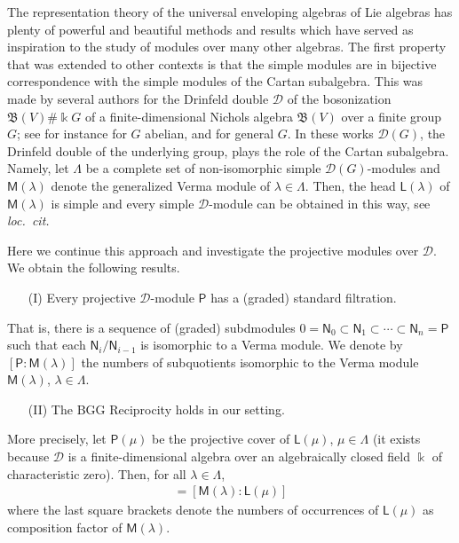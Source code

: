 \documentclass[reqno]{amsart}
\renewcommand{\_}[1]{_{\left( #1 \right)}}
\renewcommand{\^}[1]{^{\left( #1 \right)}}
\newcommand{\ku}{\Bbbk}
\newcommand\fL{\mathsf{L}}
\newcommand\fM{\mathsf{M}}
\newcommand\fN{\mathsf{N}}
\newcommand\fP{\mathsf{P}}
\newcommand{\D}{\mathcal{D}}
\newcommand{\BV}{{\mathfrak B}}
\theoremstyle{plain}
\theoremstyle{definition}
\theoremstyle{remark}
\begin{document}
The representation theory of the universal enveloping algebras of Lie algebras has plenty of powerful and beautiful methods and results which have served as inspiration to the study of modules over many other algebras. The first property that was extended to other contexts is that the simple modules are in bijective correspondence with the simple modules of the Cartan subalgebra. This was made by several authors for the Drinfeld double $\D$ of the bosonization $\BV(V)\#\ku G$ of a finite-dimensional Nichols algebra $\BV(V)$ over a finite group $G$; see for instance \cite{MR3367089,MR2732981,MR2407847,MR2840165} for $G$ abelian, and \cite{MR2279242,MR2504492,PV2} for general $G$. In these works $\D(G)$, the Drinfeld double of the underlying group, plays the role of the Cartan subalgebra. Namely, let $\Lambda$ be a complete set of non-isomorphic simple $\D(G)$-modules and $\fM(\lambda)$ denote the generalized Verma module of $\lambda\in\Lambda$. Then, the head $\fL(\lambda)$ of $\fM(\lambda)$ is simple and 
every simple $\D$-module can be obtained in this way, see {\it loc.~cit.} 

Here we continue this approach and investigate the projective modules over $\D$. We obtain the following results.

\begin{enumerate}
 \item[(I)] Every projective $\D$-module $\fP$ has a (graded) standard filtration.
\end{enumerate}
That is, there is a sequence of (graded) subdmodules $0=\fN_0\subset\fN_1\subset\cdots\subset\fN_n=\fP$ such that each $\fN_i/\fN_{i-1}$ is isomorphic to a Verma module. We denote by $[\fP:\fM(\lambda)]$ the numbers of subquotients isomorphic to the Verma module $\fM(\lambda)$, $\lambda\in\Lambda$.

\begin{enumerate}
 \item[(II)] The BGG Reciprocity holds in our setting. 
\end{enumerate}
More precisely, let $\fP(\mu)$ be the projective cover of $\fL(\mu)$, $\mu\in\Lambda$ (it exists because $\D$ is a finite-dimensional algebra over an algebraically closed field $\ku$ of characteristic zero). Then, for all $\lambda\in\Lambda$,
\begin{align*}
[\fP(\mu):\fM(\lambda)]=[\fM(\lambda):\fL(\mu)]
\end{align*}
where the last square brackets denote the numbers of occurrences of $\fL(\mu)$ as composition factor of $\fM(\lambda)$.
\end{document}
